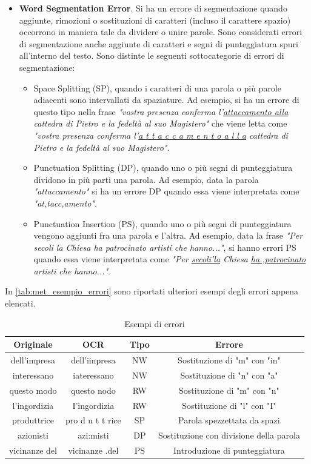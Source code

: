 \begin{itemize}
\item \textbf{Word Segmentation Error}. Si ha un errore di segmentazione quando aggiunte, rimozioni o sostituzioni di caratteri (incluso il carattere spazio) occorrono in maniera tale da dividere o unire parole. Sono considerati errori di segmentazione anche aggiunte di caratteri e segni di punteggiatura spuri all'interno del testo. Sono distinte le seguenti sottocategorie di errori di segmentazione:
	\begin{itemize}
	\item Space Splitting (SP), quando i caratteri di una parola o più parole adiacenti sono intervallati da spaziature. Ad esempio, si ha un errore di questo tipo nella frase \textit{"vostra presenza conferma l'\ul{attaccamento alla} cattedra di Pietro e la fedeltà al suo Magistero"} che viene letta come \textit{"vostra presenza conferma l'\ul{a t t a c c a m e n t o a l l a} cattedra di Pietro e la fedeltà al suo Magistero"}.
	\item Punctuation Splitting (DP), quando uno o più segni di punteggiatura dividono in più parti una parola. Ad esempio, data la parola \textit{"attaccamento"} si ha un errore DP quando essa viene interpretata come \textit{"at,tacc,amento"}.
	\item Punctuation Insertion (PS), quando uno o più segni di punteggiatura vengono aggiunti fra una parola e l'altra. Ad esempio, data la frase \textit{"Per secoli la Chiesa ha patrocinato artisti che hanno..."}, si hanno errori PS quando essa viene interpretata come \textit{"Per \ul{secoli'la} Chiesa \ul{ha.,patrocinato} artisti che hanno..."}.
	\end{itemize}
\end{itemize}

In \autoref{tab:met_esempio_errori} sono riportati ulteriori esempi degli errori appena elencati.

\begin{table}[H]
\centering
\begin{tabular}{cccc}
\textbf{Originale} & \textbf{OCR} & \textbf{Tipo} & \textbf{Errore} \\ \hline
dell'impresa & dell’iinpresa 	& NW & Sostituzione di "m" con "in" \\
interessano & iateressano 		& NW & Sostituzione di "n" con "a" \\
questo modo & questo nodo 		& RW & Sostituzione di "m" con "n" \\
l'ingordizia & I’ingordizia 	& RW & Sostituzione di "l" con "I" \\
produttrice & pro d u t t rice 	& SP & Parola spezzettata da spazi \\
azionisti & azi:misti 			& DP & Sostituzione con divisione della parola \\
vicinanze  del & vicinanze .del & PS & Introduzione di punteggiatura\\

\end{tabular}
\caption{Esempi di errori}
\label{tab:met_esempio_errori}
\end{table}

